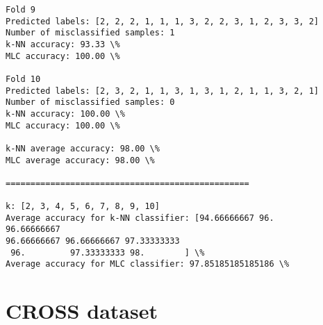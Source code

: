 \documentclass[11pt]{article}
\begin{document}
\begin{Verbatim}[commandchars=\\\{\}]
Fold 9
Predicted labels: [2, 2, 2, 1, 1, 1, 3, 2, 2, 3, 1, 2, 3, 3, 2]
Number of misclassified samples: 1
k-NN accuracy: 93.33 \%
MLC accuracy: 100.00 \%

Fold 10
Predicted labels: [2, 3, 2, 1, 1, 3, 1, 3, 1, 2, 1, 1, 3, 2, 1]
Number of misclassified samples: 0
k-NN accuracy: 100.00 \%
MLC accuracy: 100.00 \%

k-NN average accuracy: 98.00 \%
MLC average accuracy: 98.00 \%

=================================================

k: [2, 3, 4, 5, 6, 7, 8, 9, 10]
Average accuracy for k-NN classifier: [94.66666667 96.         96.66666667
96.66666667 96.66666667 97.33333333
 96.         97.33333333 98.        ] \%
Average accuracy for MLC classifier: 97.85185185185186 \%

    \end{Verbatim}

    \hypertarget{cross-dataset}{%
\section{CROSS dataset}\label{cross-dataset}}
\end{document}
